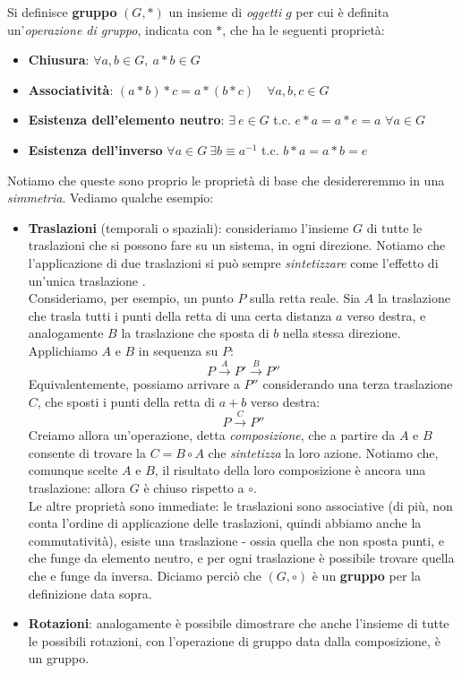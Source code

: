 \documentclass[../../FisicaTeorica.tex]{subfiles}
\begin{document}
\begin{dfn}
Si definisce \textbf{gruppo} $(G,*)$ un insieme di \textit{oggetti} $g$ per cui è definita un'\textit{operazione di gruppo}, indicata  con $*$, che ha le seguenti proprietà:
\begin{itemize}
\item \textbf{Chiusura}: $\forall a, b \in G, \> a* b \in G$
\item \textbf{Associatività}: $(a* b)* c = a* (b* c) \quad \forall a,b,c \in G$
\item \textbf{Esistenza dell'elemento neutro}: $\exists \> e \in G$ t.c. $e*a = a * e = a$ $\forall a \in G$
\item \textbf{Esistenza dell'inverso} $\forall a \in G \> \exists b \equiv a^{-1}$ t.c. $b* a = a * b = e$
\end{itemize}
\end{dfn}
Notiamo che queste sono proprio le proprietà di base che desidereremmo in una \textit{simmetria}. Vediamo qualche esempio:
\begin{itemize}
\item \textbf{Traslazioni} (temporali o spaziali): consideriamo l'insieme $G$ di tutte le traslazioni che si possono fare su un sistema, in ogni direzione. Notiamo che l'applicazione  di due traslazioni si può sempre \textit{sintetizzare} come l'effetto di un'unica traslazione .\\
Consideriamo, per esempio, un punto $P$ sulla retta reale. Sia $A$ la traslazione che trasla tutti i punti della retta di una certa distanza $a$ verso destra, e analogamente $B$ la traslazione che sposta di $b$ nella stessa direzione.\\
Applichiamo $A$ e $B$ in sequenza su $P$:
\[
P \xrightarrow{A} P' \xrightarrow{B} P''
\]
Equivalentemente, possiamo arrivare a $P''$ considerando una terza traslazione $C$, che sposti i punti della retta di $a+b$ verso destra:
\[
P \xrightarrow{C} P''
\]
Creiamo allora un'operazione, detta \textit{composizione}, che a partire da $A$ e $B$ consente di trovare la $C = B\circ A$ che \textit{sintetizza} la loro azione. Notiamo che, comunque scelte $A$ e $B$, il risultato della loro composizione è ancora una traslazione: allora $G$ è chiuso rispetto a $\circ$.\\
Le altre proprietà sono immediate: le traslazioni sono associative (di più, non conta l'ordine di applicazione delle traslazioni, quindi abbiamo anche la commutatività), esiste una traslazione  - ossia quella che non sposta punti, e che funge da elemento neutro, e per ogni traslazione è possibile trovare quella  che  e funge da inversa. Diciamo perciò che $(G,\circ)$ è un \textbf{gruppo} per la definizione data sopra.
\item \textbf{Rotazioni}: analogamente è possibile dimostrare che anche l'insieme di tutte le possibili rotazioni, con l'operazione di gruppo data dalla composizione, è un gruppo.
\end{itemize}
\end{document}
